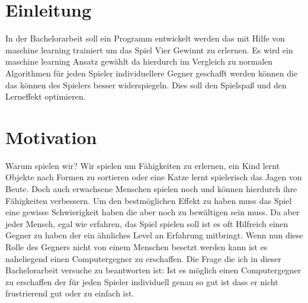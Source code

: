 \documentclass{article}
\begin{document}
 
\section{Einleitung}
In der Bachelorarbeit soll ein Programm entwickelt werden das mit Hilfe von maschine learning trainiert um das Spiel Vier Gewinnt zu erlernen. 
Es wird ein maschine learning Ansatz gewählt da hierdurch im Vergleich zu normalen Algorithmen für jeden Spieler individuellere Gegner geschafft werden können die das können des Spielers besser widerspiegeln.
Dies soll den Spielspaß und den Lerneffekt optimieren.%


\section{Motivation}
Warum spielen wir? Wir spielen um Fähigkeiten zu erlernen, ein Kind lernt Objekte nach Formen zu sortieren oder eine Katze lernt spielerisch das Jagen von Beute. Doch auch erwachsene Menschen spielen noch und können hierdurch ihre Fähigkeiten verbessern.  Um den bestmöglichen Effekt zu haben muss das Spiel eine gewisse Schwierigkeit haben die aber noch zu bewältigen sein muss. Da aber jeder Mensch, egal wie erfahren, das Spiel spielen soll ist es oft Hilfreich einen Gegner zu haben der ein ähnliches Level an Erfahrung mitbringt. Wenn nun diese Rolle des Gegners nicht von einem Menschen besetzt werden kann ist es naheliegend einen Computergegner zu erschaffen. Die Frage die ich in dieser Bachelorarbeit versuche zu beantworten ist: Ist es möglich einen Computergegner zu erschaffen der für jeden Spieler individuell genau so gut ist dass er nicht frustrierend gut oder zu einfach ist.
\end{document}
